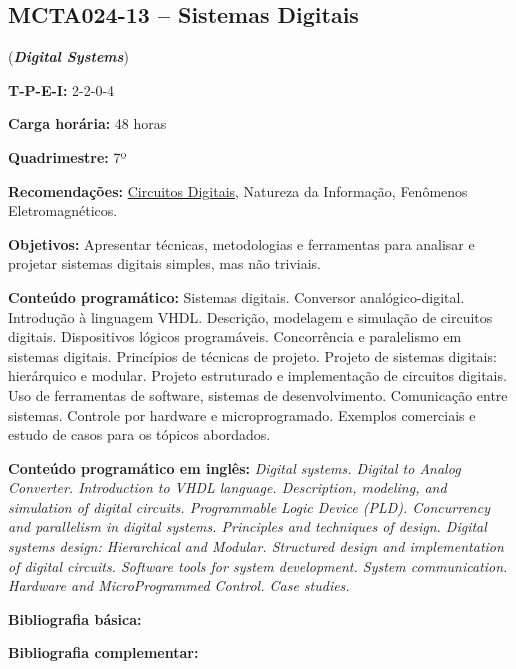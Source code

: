 \documentclass[class=article, crop=false]{standalone}
\begin{document}
\subsection*{MCTA024-13 -- Sistemas Digitais}
\label{disc:sist_dig}

(\textbf{\textit{Digital Systems}})

\begin{center}
    \begin{minipage}{0.85\textwidth}
        \textbf{T-P-E-I:} 2-2-0-4
        
        \textbf{Carga horária:} 48 horas
        
        \textbf{Quadrimestre:} 7º
        
        \textbf{Recomendações:} 
        \hyperref[disc:circ_dig]{Circuitos Digitais}, 
        Natureza da Informação,
        Fenômenos Eletromagnéticos.
    \end{minipage}
\end{center}

\textbf{Objetivos:}
Apresentar técnicas, metodologias e ferramentas para analisar e projetar
sistemas digitais simples, mas não triviais.

\textbf{Conteúdo programático:}
Sistemas digitais. 
Conversor analógico-digital. 
Introdução à linguagem VHDL. 
Descrição, modelagem e simulação de circuitos digitais. 
Dispositivos lógicos programáveis. 
Concorrência e paralelismo em sistemas digitais. 
Princípios de técnicas de projeto. 
Projeto de sistemas digitais: hierárquico e modular. 
Projeto estruturado e implementação de circuitos digitais. 
Uso de ferramentas de software, sistemas de desenvolvimento. 
Comunicação entre sistemas. 
Controle por hardware e microprogramado. 
Exemplos comerciais e estudo de casos para os tópicos abordados.

\textbf{Conteúdo programático em inglês:}
\textit{Digital systems. 
Digital to Analog Converter. 
Introduction to VHDL language. 
Description, modeling, and simulation of digital circuits. 
Programmable Logic Device (PLD). 
Concurrency and parallelism in digital systems. 
Principles and techniques of design. 
Digital systems design: Hierarchical and Modular. 
Structured design and implementation of digital circuits. 
Software tools for system development. 
System communication. 
Hardware and MicroProgrammed Control. 
Case studies.}

\newrefsection
\textbf{Bibliografia básica:}
\nocite{2008-mano, 2007-tocci, 2008-vahid}
\printbibliography

\newrefsection
\textbf{Bibliografia complementar:}
\nocite{2006-idoeta, 2000-ercegovac, 2009-bignel, 2005-katz, 2008-ashenden}
\printbibliography
\end{document}
